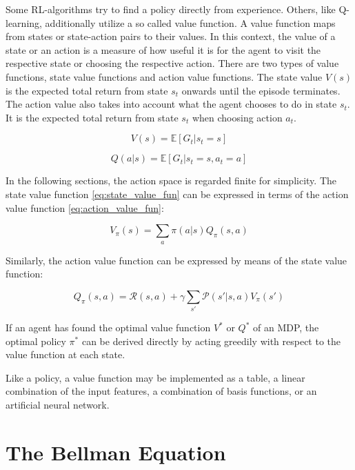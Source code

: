 Some RL-algorithms try to find a policy directly from experience. Others, like Q-learning, additionally utilize a so called value function. A value function maps from states or state-action pairs to their values. In this context, the value of a state or an action is a measure of how useful it is for the agent to visit the respective state or choosing the respective action. There are two types of value functions, state value functions and action value functions. The state value $V(s)$ is the expected total return from state $s_t$ onwards until the episode terminates. The action value also takes into account what the agent chooses to do in state $s_t$. It is the expected total return from state $s_t$ when choosing action $a_t$.

\begin{equation}
V(s) = \mathbb{E}[G_t|s_t=s]
\label{eq:state_value_fun}
\end{equation}

\begin{equation}
Q(a|s) = \mathbb{E}[G_t|s_t=s,a_t=a]
\label{eq:action_value_fun}
\end{equation}

In the following sections, the action space is regarded finite for simplicity.
The state value function \ref{eq:state_value_fun} can be expressed in terms of the action value function \ref{eq:action_value_fun}:

\begin{equation}
V_\pi(s) = \sum_{a}\pi(a|s)Q_\pi(s,a)
\label{eq:state_value_function_with_q}
\end{equation}

Similarly, the action value function can be expressed by means of the state value function:

\begin{equation}
Q_\pi(s,a)=\mathcal{R}(s,a)+\gamma \sum_{s'}\mathcal{P}(s'|s,a)V_\pi(s')
\label{eq:action_value_function_with_v}
\end{equation}

If an agent has found the optimal value function $V^*$ or $Q^*$ of an MDP, the optimal policy $\pi^*$ can be derived directly by acting greedily with respect to the value function at each state.

Like a policy, a value function may be implemented as a table, a linear combination of the input features, a combination of basis functions, or an artificial neural network.

\section{The Bellman Equation}

